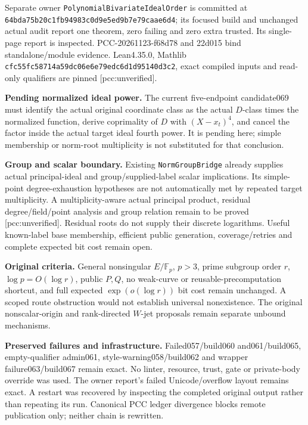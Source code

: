 \documentclass[11pt]{article}
\begin{document}
Separate owner \texttt{PolynomialBivariateIdealOrder} is committed at
\texttt{64bda75b20c1fb94983c0d9e5ed9b7e79caae6d4};
its focused build and unchanged actual audit report one theorem,
zero failing and zero extra trusted. Its single-page report is inspected.
PCC-20261123-f68d78 and 22d015 bind standalone/module evidence.
Lean4.35.0, Mathlib
\texttt{cfc55fc58714a59dc06e6e79edc6d1d95140d3c2},
exact compiled inputs and read-only qualifiers are pinned
[pcc:unverified].

\textbf{Pending normalized ideal power.}
The current five-endpoint candidate069 must identify the actual original
coordinate class as the actual \(D\)-class times the normalized function,
derive coprimality of \(D\) with \((X-x_t)^4\), and cancel the factor inside
the actual target ideal fourth power.
It is pending here; simple membership or norm-root multiplicity is not
substituted for that conclusion.

\textbf{Group and scalar boundary.}
Existing \texttt{NormGroupBridge} already supplies actual principal-ideal
and group/supplied-label scalar implications.
Its simple-point degree-exhaustion hypotheses are not automatically met by
repeated target multiplicity. A multiplicity-aware actual principal product,
residual degree/field/point analysis and group relation remain to be proved [pcc:unverified].
Residual roots do not supply their discrete logarithms.
Useful known-label base membership, efficient public generation,
coverage/retries and complete expected bit cost remain open.

\textbf{Original criteria.}
General nonsingular \(E/\mathbb F_p\), \(p>3\), prime subgroup order \(r\),
\(\log p=O(\log r)\), public \(P,Q\), no weak-curve or reusable-precomputation
shortcut, and full expected \(\exp(o(\log r))\) bit cost remain unchanged.
A scoped route obstruction would not establish universal nonexistence.
The original nonscalar-origin and rank-directed \(W\)-jet proposals remain
separate unbound mechanisms.

\textbf{Preserved failures and infrastructure.}
Failed057/build060 and061/build065, empty-qualifier admin061,
style-warning058/build062 and wrapper failure063/build067 remain exact.
No linter, resource, trust, gate or private-body override was used.
The owner report's failed Unicode/overflow layout remains exact.
A restart was recovered by inspecting the completed original output rather
than repeating its run. Canonical PCC ledger divergence blocks remote
publication only; neither chain is rewritten.
\end{document}

